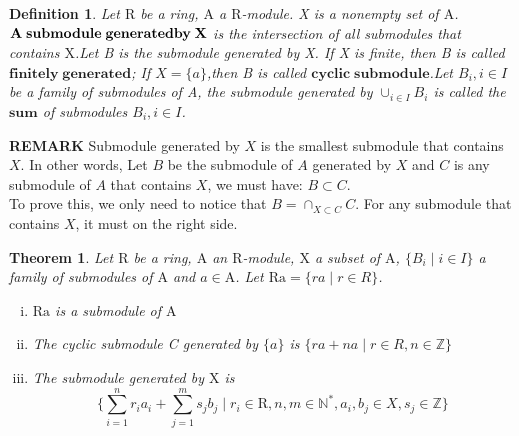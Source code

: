 \documentclass[a4paper]{article}
\newtheorem{myDef}{Definition}
\newtheorem{myTheo}{Theorem}
\newcommand{\N}{\mathbb{N}}
\newcommand{\Z}{\mathbb{Z}}
\begin{document}
    \vspace{0.5cm}
    \begin{myDef}
        Let $\mathrm{R}$ be a ring, $\mathrm{A}$ a $\mathrm{R}$-module. X is a nonempty set of $\mathrm{A}$. $\mathbf{A\;submodule\;generated\\by\;X}$ is the intersection of all submodules that 
        contains $\mathrm{X}$.Let B is the submodule generated by X. If X is finite, then B is called $\mathbf{finitely\;generated}$; If $X=\{a\}$,then B is called $\mathbf{cyclic\;submodule}$.Let $B_i,i\in I$
        be a family of submodules of A, the submodule generated by $\cup_{i\in I}B_i$ is called the $\mathbf{sum}$ of submodules $B_i,i\in I$.
    \end{myDef}
    \textbf{REMARK} Submodule generated by $X$ is the smallest submodule that contains $X$. In other words, Let $B$ be the submodule of $A$ generated by $X$ and $C$ is any submodule of $A$ that contains $X$, we must have: $B\subset C$.\\
    To prove this, we only need to notice that $B=\cap_{X\subset C}C$. For any submodule that contains $X$, it must on the right side.
    \vspace{0.5cm}
    \begin{myTheo}
        Let $\mathrm{R}$ be a ring, $\mathrm{A}$ an $\mathrm{R}$-module, $\mathrm{X}$ a subset of $\mathrm{A}$, $\{B_i\;|\;i\in I\}$ a family of submodules of $\mathrm{A}$ and $a\in \mathrm{A}$. Let $\mathrm{Ra}=\{ra\;|\;r\in R\}$.
        \begin{enumerate}[(i)]
            \item $\mathrm{Ra}$ is a submodule of $\mathrm{A}$
            \item The cyclic submodule C generated by $\{a\}$ is $\{ra+na\;|\; r\in R, n\in \Z\}$
            \item The submodule generated by $\mathrm{X}$ is \\
            $$
            \{\sum_{i=1}^nr_ia_i+\sum_{j=1}^ms_jb_j\;|\; r_i\in \mathrm{R}, n,m\in \N^*,a_i,b_j\in X,s_j\in \Z\}
            $$
        \end{enumerate}
    \end{myTheo}
\end{document}
